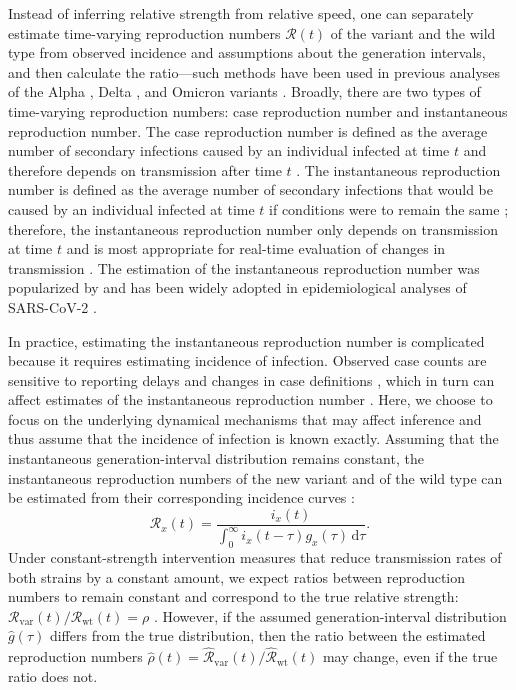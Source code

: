 \documentclass[12pt]{article}
\newcommand{\vvvar}{\mathrm{var}}
\newcommand{\wwwt}{\mathrm{wt}}
\newcommand{\Rx}[1]{\ensuremath{{\mathcal R}_{#1}}\xspace}
\newcommand{\RR}{\ensuremath{{\mathcal R}}\xspace}
\newcommand{\Rw}{\Rx{\wwwt}}
\newcommand{\Rv}{\Rx{\vvvar}}
\newcommand{\dd}[1]{\ensuremath{\, \mathrm{d}#1}}
\newcommand{\dtau}{\dd{\tau}}
\begin{document}
Instead of inferring relative strength from relative speed, one can separately estimate time-varying reproduction numbers $\RR(t)$ of the variant and the wild type from observed incidence and assumptions about the generation intervals, and then calculate the ratio---such methods have been used in previous analyses of the Alpha \citep{volz2021transmission}, Delta \citep{abbott2021estimating}, and Omicron variants \citep{pearson2021bounding}.
Broadly, there are two types of time-varying reproduction numbers: case reproduction number and instantaneous reproduction number.
The case reproduction number is defined as the average number of secondary infections caused by an individual infected at time $t$ and therefore depends on transmission after time $t$ \citep{wallinga2004different}.
The instantaneous reproduction number is defined as the average number of secondary infections that would be caused by an individual infected at time $t$ if conditions were to remain the same \citep{fraser2007estimating}; 
therefore, the instantaneous reproduction number only depends on transmission at time $t$ and is most appropriate for real-time evaluation of changes in transmission \citep{gostic2020practical}.
The estimation of the instantaneous reproduction number was popularized by \cite{cori2013new} and has been widely adopted in epidemiological analyses of SARS-CoV-2 \citep{abbott2020estimating,knight2020estimating,flaxman2020Rt,brauner2021inferring,li2021temporal}.

In practice, estimating the instantaneous reproduction number is complicated because it requires estimating incidence of infection.
Observed case counts are sensitive to reporting delays \citep{goldstein2009reconstructing} and changes in case definitions \citep{tsang2020effect}, which in turn can affect estimates of the instantaneous reproduction number \citep{gostic2020practical}.
Here, we choose to focus on the underlying dynamical mechanisms that may affect inference and thus assume that the incidence of infection is known exactly.
Assuming that the instantaneous generation-interval distribution remains constant, the instantaneous reproduction numbers of the new variant and of the wild type can be estimated from their corresponding incidence curves \cite{cori2013new}:
\begin{equation}
\RR_x(t) = \frac{i_x(t)}{\int_0^\infty i_x(t-\tau) g_x(\tau) \dtau}.
\label{eq:rt}
\end{equation}
Under constant-strength intervention measures that reduce transmission rates of both strains by a constant amount, we expect ratios between reproduction numbers to remain constant and correspond to the true relative strength: $\Rv(t)/\Rw(t) = \rho$ \citep{leung2017monitoring,leung2020empirical,di2021impact,leung2021early}.
However, if the assumed generation-interval distribution $\hat{g}(\tau)$ differs from the true distribution, then the ratio between the estimated reproduction numbers $\hat{\rho}(t) = \hat{\RR}_{\textrm{var}}(t)/\hat{\RR}_{\textrm{wt}}(t)$ may change, even if the true ratio does not.
\end{document}
